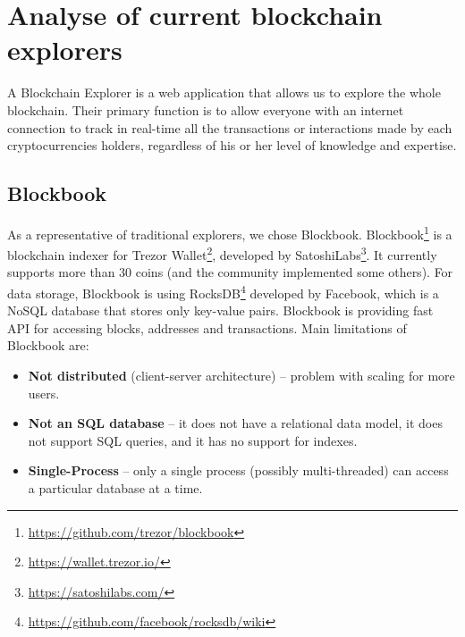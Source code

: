 \section{Analyse of current blockchain explorers}
A Blockchain Explorer is a web application that allows us to explore the whole blockchain. Their primary function is to allow everyone with an internet connection to track in real-time all the transactions or interactions made by each cryptocurrencies holders, regardless of his or her level of knowledge and expertise. \cite{laurence2019blockchain}\cite{dhillon2017blockchain}


\subsection{Blockbook}
As a representative of traditional explorers, we chose Blockbook. Blockbook\footnote{\url{https://github.com/trezor/blockbook}} is a blockchain indexer for Trezor Wallet\footnote{\url{https://wallet.trezor.io/}}, developed by SatoshiLabs\footnote{\url{https://satoshilabs.com/}}. It currently supports more than 30 coins (and the community implemented some others). For data storage, Blockbook is using RocksDB\footnote{\url{https://github.com/facebook/rocksdb/wiki}} developed by Facebook, which is a NoSQL database that stores only key-value pairs. Blockbook is providing fast API for accessing blocks, addresses and transactions. Main limitations of Blockbook are:
\begin{itemize}
    \item \textbf{Not distributed} (client-server architecture) -- problem with scaling for more users. 
    \item \textbf{Not an SQL database} -- it does not have a relational data model, it does not support SQL queries, and it has no support for indexes.
    \item \textbf{Single-Process} -- only a single process (possibly multi-threaded) can access a particular database at a time.
\end{itemize}